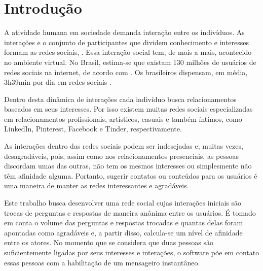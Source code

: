 \chapter{Introdução}




A atividade humana em sociedade demanda interação entre os indivíduos. As interações e o conjunto de participantes que dividem conhecimento e interesses formam as redes sociais, \citep{Marteleto01}. Essa interação social tem, de mais a mais, acontecido no ambiente virtual. No Brasil, estima-se que existam 130 milhões de usuários de redes sociais na internet, de acordo com \cite{wearesocial18}. Os brasileiros dispensam, em média, 3h39min por dia em redes sociais \citep{wearesocial18}.

Dentro desta dinâmica de interações cada indivíduo busca relacionamentos baseados em seus interesses. Por isso existem muitas redes sociais especializadas em relacionamentos profissionais, artísticos, casuais e também íntimos, como LinkedIn, Pinterest, Facebook e Tinder, respectivamente.

As interações dentro das redes sociais podem ser indesejadas e, muitas vezes, desagradáveis, pois, assim como nos relacionamentos presenciais, as pessoas discordam umas das outras, não tem os mesmos interesses ou simplesmente não têm afinidade alguma. Portanto, sugerir contatos ou conteúdos para os usuários é uma maneira de manter as redes interessantes e agradáveis.

Este trabalho busca desenvolver uma rede social cujas interações iniciais são trocas de perguntas e respostas de maneira anônima entre os usuários. É tomado em conta o volume das perguntas e respostas trocadas e quantas delas foram apontadas como agradáveis e, a partir disso, calcula-se um nível de afinidade entre os atores. No momento que se considera que duas pessoas são suficientemente ligadas por seus interesses e interações, o software põe em contato essas pessoas com a habilitação de um mensageiro instantâneo.

